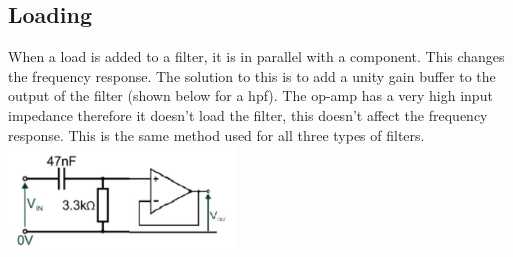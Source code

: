 \documentclass[a4paper,11pt, twocolumn]{article}
\begin{document}
\subsection{Loading}
When a load is added to a filter, it is in parallel with a component. This changes the frequency response. The solution to this is to add a unity gain buffer to the output of the filter (shown below for a hpf). The op-amp has a very high input impedance therefore it doesn't load the filter, this doesn't affect the frequency response. This is the same method used for all three types of filters.\\
\includegraphics[width=0.45\textwidth]{load.jpg}
\end{document}
